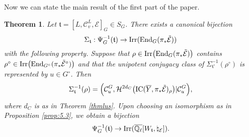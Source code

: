 \documentclass[11pt]{amsart}
\newtheorem{thm}{Theorem}[section]
\theoremstyle{definition}
\newcommand{\Q}{\mathbb Q}
\def\End{{\rm End}}
\def\Irr{{\rm Irr}}
\def\cC{{\mathcal C}}
\def\cH{{\mathcal H}}
\def\cE{{\mathcal E}}
\def\ft{{\mathfrak t}}
\def\IC{{\rm{IC}}}
\begin{document}
Now we can state the main result of the first part of the paper.

\begin{thm}\label{thm:5.5}
Let $\ft = [L,\cC_v^L,\cE]_G \in S_G$. There exists a canonical bijection
\[
\Sigma_\ft : \Psi_G^{-1}(\ft) \to \Irr (\End_G (\pi_* \tilde{\cE}))
\]
with the following property. Suppose that $\rho \in \Irr \big( \End_G 
(\pi_* \tilde{\cE})\big)$ contains $\rho^\circ \in \\ \Irr \big( \End_{G^\circ}
(\pi_* \tilde{\cE}^\circ) \big)$ and that the unipotent conjugacy class of 
$\Sigma_{\ft^\circ}^{-1}(\rho^\circ)$ is represented by $u \in G^\circ$. Then
\[
\Sigma_\ft^{-1}(\rho) = \Big( \cC_u^G, \cH^{2d_C} 
\big( \IC (\overline{Y},\pi_* \tilde{\cE})_\rho \big) | \cC_u^G \Big) ,
\]
where $d_C$ is as in Theorem \ref{thmlus}.
Upon choosing an isomorphism as in Proposition \ref{prop:5.3}, we obtain a bijection
\[
\Psi_G^{-1}(\ft) \to \Irr ( \overline{\Q_{\ell}} [W_\ft,\natural_\cE]) .
\]
\end{thm}
\end{document}
